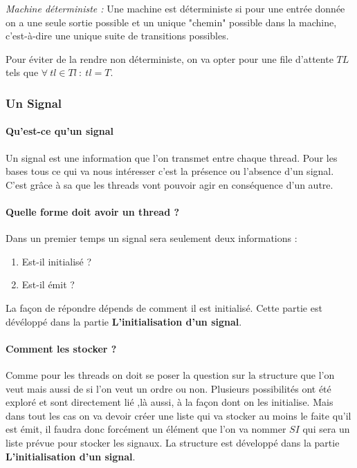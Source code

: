 \documentclass[10pt,a4paper]{article}
\begin{document}
					\textit{Machine déterministe :} Une machine est déterministe si pour une entrée donnée on a une seule sortie possible et un unique "chemin" possible dans la machine, c'est-à-dire une unique suite de transitions possibles.
					\medbreak
					
					Pour éviter de la rendre non déterministe, on va opter pour une file d'attente $TL$ tels que $\forall~tl \in Tl~:~tl = T$.
					\bigbreak
					
				\subsubsection{Un Signal} 
				
					\paragraph{Qu'est-ce qu'un signal}
					Un signal est une information que l'on transmet entre chaque thread. Pour les bases tous ce qui va nous intéresser c'est la présence ou l'absence d'un signal. C'est grâce à sa que les threads vont pouvoir agir en conséquence d'un autre. 
					
					\paragraph{Quelle forme doit avoir un thread ?} 
					Dans un premier temps un signal sera seulement deux informations : 
					\begin{enumerate}
						\item Est-il initialisé ?
						\item Est-il émit ?
					\end{enumerate}
					La façon de répondre dépends de comment il est initialisé. Cette partie est dévéloppé dans la partie \textbf{L'initialisation d'un signal}.
					
					\paragraph{Comment les stocker ?}
					Comme pour les threads on doit se poser la question sur la structure que l'on veut mais aussi de si l'on veut un ordre ou non. Plusieurs possibilités ont été exploré et sont directement lié ,là aussi, à la façon dont on les initialise. Mais dans tout les cas on va devoir créer une liste qui va stocker au moins le faite qu'il est émit, il faudra donc forcément un élément que l'on va nommer $SI$ qui sera un liste prévue pour stocker les signaux. La structure est développé dans la partie \textbf{L'initialisation d'un signal}.
					\medbreak 
					
\end{document}
